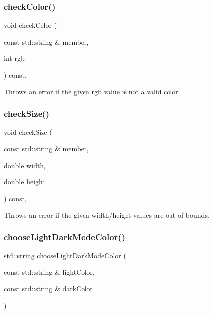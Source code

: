 \subsubsection{\texorpdfstring{check\+Color()}{checkColor()}}
{\footnotesize\ttfamily void check\+Color (\begin{DoxyParamCaption}\item[{const std\+::string \&}]{member,  }\item[{int}]{rgb }\end{DoxyParamCaption}) const\hspace{0.3cm}{\ttfamily [protected]}, {\ttfamily [inherited]}}



Throws an error if the given rgb value is not a valid color. 

\mbox{\label{classsgl_1_1GDrawingSurface_a70a6546707ae708573396616bd0f5320}} 
\subsubsection{\texorpdfstring{check\+Size()}{checkSize()}}
{\footnotesize\ttfamily void check\+Size (\begin{DoxyParamCaption}\item[{const std\+::string \&}]{member,  }\item[{double}]{width,  }\item[{double}]{height }\end{DoxyParamCaption}) const\hspace{0.3cm}{\ttfamily [protected]}, {\ttfamily [inherited]}}



Throws an error if the given width/height values are out of bounds. 

\mbox{\label{classsgl_1_1GWindow_a14da494e7a105db49b15cbd11db68774}} 
\subsubsection{\texorpdfstring{choose\+Light\+Dark\+Mode\+Color()}{chooseLightDarkModeColor()}}
{\footnotesize\ttfamily std\+::string choose\+Light\+Dark\+Mode\+Color (\begin{DoxyParamCaption}\item[{const std\+::string \&}]{light\+Color,  }\item[{const std\+::string \&}]{dark\+Color }\end{DoxyParamCaption})\hspace{0.3cm}{\ttfamily [static]}}



